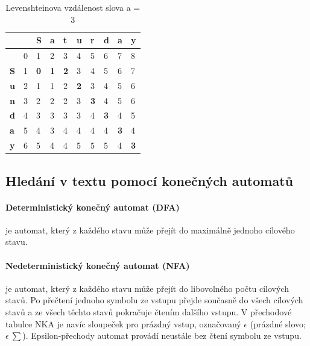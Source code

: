 \begin{table}[h]
\begin{tabular}{|l|l|l|l|l|l|l|l|l|l|}
\hline
           &   & \textbf{S} & \textbf{a} & \textbf{t} & \textbf{u} & \textbf{r} & \textbf{d} & \textbf{a} & \textbf{y} \\ \hline
           & 0 & 1          & 2          & 3          & 4          & 5          & 6          & 7          & 8          \\ \hline
\textbf{S} & 1 & \textbf{0} & \textbf{1} & \textbf{2} & 3          & 4          & 5          & 6          & 7          \\ \hline
\textbf{u} & 2 & 1          & 1          & 2          & \textbf{2} & 3          & 4          & 5          & 6          \\ \hline
\textbf{n} & 3 & 2          & 2          & 2          & 3          & \textbf{3} & 4          & 5          & 6          \\ \hline
\textbf{d} & 4 & 3          & 3          & 3          & 3          & 4          & \textbf{3} & 4          & 5          \\ \hline
\textbf{a} & 5 & 4          & 3          & 4          & 4          & 4          & 4          & \textbf{3} & 4          \\ \hline
\textbf{y} & 6 & 5          & 4          & 4          & 5          & 5          & 5          & 4          & \textbf{3} \\ \hline
\end{tabular}
\vspace{15px}
\caption{Levenshteinova vzdálenost slova  a  = 3}
\end{table}

\subsection{Hledání v textu pomocí konečných automatů}

\paragraph{Deterministický konečný automat (DFA)} je automat, který z každého stavu může přejít do maximálně jednoho cílového stavu.

\paragraph{Nedeterministický konečný automat (NFA)} je automat, který z každého stavu může přejít do libovolného počtu cílových stavů. Po přečtení jednoho symbolu ze vstupu přejde současně do všech cílových stavů a ze všech těchto stavů pokračuje čtením dalšího vstupu. V přechodové tabulce NKA je navíc sloupeček pro prázdný vstup, označovaný $\epsilon$ (prázdné slovo; $\epsilon~\sum$). Epsilon-přechody automat provádí neustále bez čtení symbolu ze vstupu.

